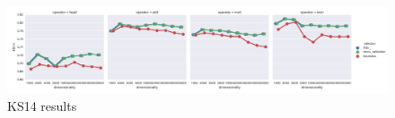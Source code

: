 \begin{figure}
  \centering

    \includegraphics[width=\textwidth]{supplement/figures/ks14-results}
  \caption{KS14 results}
  \label{fig:ks14-results}
\end{figure}

